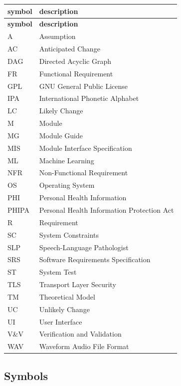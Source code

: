 \documentclass[12pt, titlepage]{article}
\begin{document}
\renewcommand{\arraystretch}{1.2}
\begin{longtable}{l l}
  \toprule
  \textbf{symbol} & \textbf{description}\\
  \midrule
  \endfirsthead

  \toprule
  \textbf{symbol} & \textbf{description}\\
  \midrule
  \endhead

  \bottomrule
  \endfoot

  \bottomrule
  \endlastfoot

  A & Assumption\\
  AC & Anticipated Change\\
  DAG & Directed Acyclic Graph \\
  FR & Functional Requirement\\
  GPL & GNU General Public License\\
  IPA & International Phonetic Alphabet\\
  LC & Likely Change\\
  M & Module \\
  MG & Module Guide \\
  MIS & Module Interface Specification\\
  ML & Machine Learning\\
  NFR & Non-Functional Requirement\\
  OS & Operating System \\
  PHI & Personal Health Information\\
  PHIPA & Personal Health Information Protection Act\\
  R & Requirement\\
  SC & System Constraints \\
  SLP & Speech-Language Pathologist\\
  SRS & Software Requirements Specification\\
  ST & System Test\\
  TLS & Transport Layer Security\\
  TM & Theoretical Model\\
  UC & Unlikely Change \\
  UI & User Interface\\
  V\&V & Verification and Validation\\
  WAV & Waveform Audio File Format\\
\end{longtable}

\subsection{Symbols}
\end{document}
